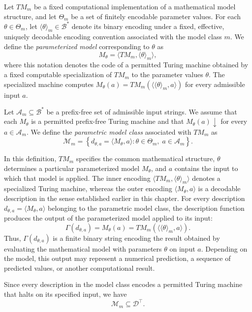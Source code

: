 \begin{definition}
\label{def:parametric_model}
Let $TM_m$ be a fixed computational implementation of a mathematical model structure, and let $\Theta_m$ be a set of finitely encodable parameter values. For each $\theta\in\Theta_m$, let $\langle\theta\rangle_m\in\mathcal{B}^\ast$ denote its binary encoding under a fixed, effective, uniquely decodable encoding convention associated with the model class $m$. We define the \emph{parameterized model} corresponding to $\theta$ as
\[
M_\theta = \langle TM_m,\langle\theta\rangle_m\rangle,
\]
where this notation denotes the code of a permitted Turing machine obtained by a fixed computable specialization of $TM_m$ to the parameter values $\theta$. The specialized machine computes $M_\theta(a)=TM_m(\langle\langle\theta\rangle_m,a\rangle)$ for every admissible input $a$.

Let $\mathcal{A}_m\subseteq\mathcal{B}^\ast$ be a prefix-free set of admissible input strings. We assume that each $M_\theta$ is a permitted prefix-free Turing machine and that $M_\theta(a)\downarrow$ for every $a\in\mathcal{A}_m$. We define the \emph{parametric model class} associated with $TM_m$ as
\[
\mathcal{M}_m = \left\{d_{\theta,a}=\langle M_\theta,a\rangle : \theta\in\Theta_m,\; a\in\mathcal{A}_m \right\}.
\]
\end{definition}

In this definition, $TM_m$ specifies the common mathematical structure, $\theta$ determines a particular parameterized model $M_\theta$, and $a$ contains the input to which that model is applied. The inner encoding $\langle TM_m,\langle\theta\rangle_m\rangle$ denotes a specialized Turing machine, whereas the outer encoding $\langle M_\theta,a\rangle$ is a decodable description in the sense established earlier in this chapter. For every description $d_{\theta,a}=\langle M_\theta,a\rangle$ belonging to the parametric model class, the description function produces the output of the parameterized model applied to its input:
\[
\Gamma(d_{\theta,a}) = M_\theta(a) = TM_m(\langle\langle\theta\rangle_m,a\rangle).
\]
Thus, $\Gamma(d_{\theta,a})$ is a finite binary string encoding the result obtained by evaluating the mathematical model with parameters $\theta$ on input $a$. Depending on the model, this output may represent a numerical prediction, a sequence of predicted values, or another computational result.

Since every description in the model class encodes a permitted Turing machine that halts on its specified input, we have
\[
\mathcal{M}_m\subseteq\mathcal{D}^\top.
\]

